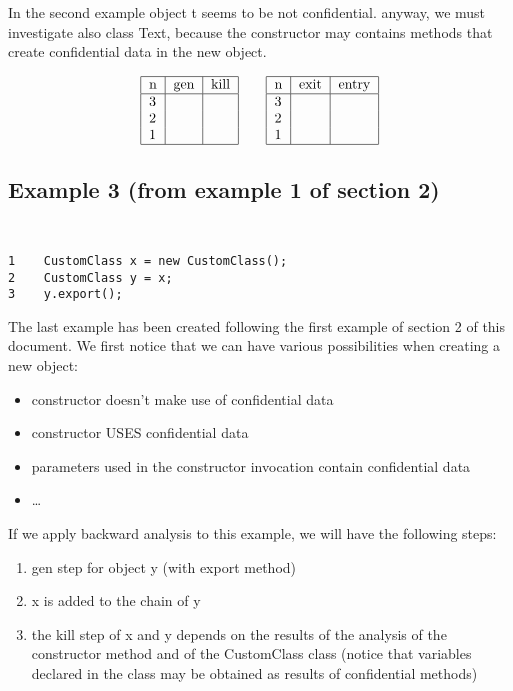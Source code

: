 \documentclass[letterpaper,twocolumn,10pt]{article}
\begin{document}
In the second example object t seems to be not confidential. anyway, we must investigate also class Text, because the constructor may contains methods that create confidential data in the new object.

\begin{align*}
\begin{tabular}{|l|*{2}{c|}}
  \hline
  n & gen & kill  \\
  \hline 
  3 &  & \\ 
  2 &  &\\
  1 &  & \\
  \hline
\end{tabular}
\qquad
\begin{tabular}{|l|*{2}{c|}}
  \hline
  n & exit & entry  \\
  \hline 
  3 &  & \\ 
  2 &  &\\
  1 &  & \\
  \hline
\end{tabular}
\end{align*}

\subsection{Example 3 (from example 1 of section 2)}
{\tt \small
\begin{verbatim}
1    CustomClass x = new CustomClass();
2    CustomClass y = x;
3    y.export();
\end{verbatim}
}

The last example has been created following the first example of section 2 of this document. We first notice that we can have various possibilities when creating a new object:\\

\begin{itemize}
  \item constructor doesn't make use of confidential data
  \item constructor USES confidential data
  \item parameters used in the constructor invocation contain confidential data
  \item \ldots
\end{itemize}

If we apply backward analysis to this example, we will have the following steps:

\begin{enumerate}
\item gen step for object y (with export method)
\item x is added to the chain of y
\item the kill step of x and y depends on the results of the analysis of the constructor method and of the CustomClass class (notice that variables declared in the class may be obtained as results of confidential methods)
\end{enumerate}
\end{document}
